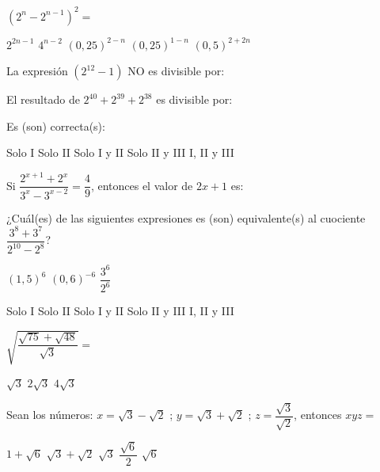 \documentclass[pagina vacia]{srs}
\begin{document}
\begin{preguntas}
\pregunta \(\left(2^n - 2^{n-1}\right)^2 =\)
\begin{vertical}
\alternativa \(2^{2n-1}\)
\alternativa \(4^{n-2}\)
\alternativa \((0,25)^{2-n}\)
\alternativa \((0,25)^{1-n}\)
\alternativa \((0,5)^{2+2n}\)
\end{vertical}

\pregunta La expresión \((2^{12} - 1)\) NO es divisible por:
\begin{vertical}
\end{vertical}

\pregunta El resultado de \(2^{40} + 2^{39} + 2^{38}\) es divisible por:
\begin{verticali}
\end{verticali}
Es (son) correcta(s):
\begin{vertical}
\alternativa Solo I
\alternativa Solo II
\alternativa Solo I y II
\alternativa Solo II y III
\alternativa I, II y III
\end{vertical}

\pregunta Si \(\dfrac{2^{x+1} + 2^x}{3^x - 3^{x-2}} = \dfrac{4}{9}\), entonces el valor de \(2x+1\) es:
\begin{vertical}
\end{vertical}

\pregunta ¿Cuál(es) de las siguientes expresiones es (son) equivalente(s) al cuociente \(\dfrac{3^8 + 3^7}{2^{10} - 2^8}\)?
\begin{verticali}
\alternativa \((1,5)^6\)
\alternativa \((0,6)^{-6}\)
\alternativa \(\dfrac{3^6}{2^6}\)
\end{verticali}
\begin{vertical}
\alternativa Solo I
\alternativa Solo II
\alternativa Solo I y II
\alternativa Solo II y III
\alternativa I, II y III
\end{vertical}

\pregunta \(\sqrt{\dfrac{\sqrt{75} + \sqrt{48}}{\sqrt{3}}} =\)
\begin{vertical}
\alternativa \(\sqrt{3}\)
\alternativa \(2\sqrt{3}\)
\alternativa \(4\sqrt{3}\)
\end{vertical}

\pregunta Sean los números: \(x = \sqrt{3} - \sqrt{2}\) ; \(y = \sqrt{3} + \sqrt{2}\) ; \(z = \dfrac{\sqrt{3}}{\sqrt{2}}\), entonces \(xyz =\)
\begin{vertical}
\alternativa \(1 + \sqrt{6}\)
\alternativa \(\sqrt{3} + \sqrt{2}\)
\alternativa \(\sqrt{3}\)
\alternativa \(\dfrac{\sqrt{6}}{2}\)
\alternativa \(\sqrt{6}\)
\end{vertical}


\end{preguntas}
\end{document}
